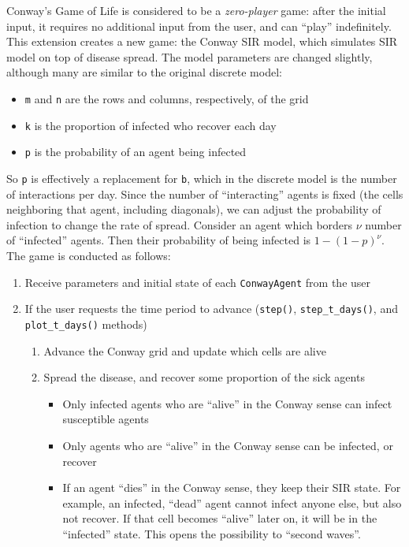 \documentclass[twoside]{extarticle}                                    %
\numberwithin{equation}{section}                                       %
\begin{document}
Conway's Game of Life is considered to be a \emph{zero-player} game: after the initial input, it requires no additional input from the user, and can ``play'' indefinitely. This extension creates a new game: the Conway SIR model, which simulates SIR model on top of disease spread. The model parameters are changed slightly, although many are similar to the original discrete model:
\begin{itemize}[itemsep = 0em]
    \item \texttt{m} and \texttt{n} are the rows and columns, respectively, of the grid
    \item \texttt{k} is the proportion of infected who recover each day
    \item \texttt{p} is the probability of an agent being infected
\end{itemize}
So \texttt{p} is effectively a replacement for \texttt{b}, which in the discrete model is the number of interactions per day. Since the number of ``interacting'' agents is fixed (the cells neighboring that agent, including diagonals), we can adjust the probability of infection to change the rate of spread. Consider an agent which borders $\nu$ number of ``infected'' agents. Then their probability of being infected is $1 - (1 - p)^\nu$. The game is conducted as follows:
\begin{enumerate}[label = (\arabic*), itemsep = 0em]
    \item Receive parameters and initial state of each \texttt{ConwayAgent} from the user
    \item If the user requests the time period to advance (\texttt{step()}, \texttt{step\_t\_days()}, and \texttt{plot\_t\_days()} methods)
    \begin{enumerate}[label = (\roman*), itemsep = 0em]
        \item Advance the Conway grid and update which cells are alive
        \item Spread the disease, and recover some proportion of the sick agents
            \begin{itemize}[itemsep = 0em]
                \item Only infected agents who are ``alive'' in the Conway sense can infect susceptible agents
                \item Only agents who are ``alive'' in the Conway sense can be infected, or recover
                \item If an agent ``dies'' in the Conway sense, they keep their SIR state. For example, an infected, ``dead'' agent cannot infect anyone else, but also not recover. If that cell becomes ``alive'' later on, it will be in the ``infected'' state. This opens the possibility to ``second waves''.
            \end{itemize}
    \end{enumerate}
\end{enumerate}
\end{document}
